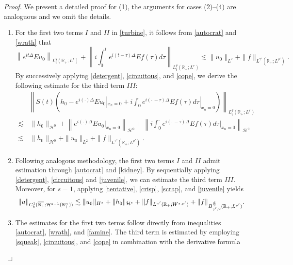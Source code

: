 \documentclass[preprint,compress,12pt]{elsarticle}
\numberwithin{equation}{section}
\begin{document}
\begin{proof}
	We present a detailed proof for (1), the arguments for cases (2)--(4) are analoguous and we omit the details.
	\begin{enumerate}[label=(\arabic*)]
		\item For the first two terms $I$ and $II$ in \eqref{turbine}, it follows from \eqref{autocrat} and \eqref{wrath} that
		\begin{equation*}
			\left\|e^{it\Delta}Eu_{0}\right\|_{L^{q}_{t}(\mathbb{R}_{+};L^{r})}+\left\|i\int_{0}^{t}e^{i(t-\tau)\Delta}Ef(\tau)d\tau\right\|_{L_{t}^{q}(\mathbb{R}_{+};L^{r})}\lesssim\|u_{0}\|_{L^{2}}+\|f\|_{L^{\gamma'}(\mathbb{R}_{+}; L^{\rho'})}.
		\end{equation*}
		By successively applying \eqref{detergent}, \eqref{circuitous}, and \eqref{cope}, we derive the following estimate for the third term $III$:
		\begin{equation*}
			\begin{aligned}
				&\left\| S(t)\left(h_{0}-e^{i(\cdot)\Delta}Eu_{0}|_{x_{n}=0}+i\int_{0}^{\cdot}e^{i(\cdot\,-\tau)\Delta}Ef(\tau)d\tau|_{x_{n}=0}\right)\right\|_{L_{t}^{q}(\mathbb{R}_{+};L^{r})}\\
				\lesssim &\, \|h_{0}\|_{\mathcal{H}^{0}}+\left\|e^{i(\cdot)\Delta}Eu_{0}|_{x_{n}=0}\right\|_{\mathcal{H}^{0}}+\left\|i\int_{0}^{\cdot}e^{i(\cdot\,-\tau)\Delta}Ef(\tau)d\tau|_{x_{n}=0}\right\|_{\mathcal{H}^{0}}\\
				\lesssim &\, \|h_{0}\|_{\mathcal{H}^{0}}+\|u_{0}\|_{L^{2}}+\|f\|_{L^{\gamma'}(\mathbb{R}_{+};L^{\rho'})}.
			\end{aligned}
		\end{equation*}
		\item Following analogous methodology, the first two terms $I$ and $II$ admit estimation through \eqref{autocrat} and \eqref{kidney}. By sequentially applying \eqref{detergent}, \eqref{circuitous} and \eqref{juvenile}, we can estimate the third term $III$. Moreover, for $s=1$, applying \eqref{tentative}, \eqref{crisp}, \eqref{scrap}, and \eqref{juvenile} yields
		\begin{equation}\label{contagious}
			\|u\|_{ C_{b}^{1}(\overline{\mathbb{R}_{+}\mkern-4mu}\,;\mathcal{H}^{s-1}(\mathbb{R}_{+}^{n}))}\lesssim\|u_{0}\|_{H^{s}}+\|h_{0}\|_{\mathcal{H}^{s}}+ \|f\|_{L^{\gamma'} (\mathbb{R}_{+};  W^{s,\rho'})}+\|f\|_{B^{\frac{s}{2}}_{\gamma',2} (\mathbb{R}_{+}; L^{\rho'})}.
		\end{equation}
		\item The estimates for the first two terms follow directly from inequalities \eqref{autocrat}, \eqref{wrath}, and \eqref{famine}. The third term is estimated by employing \eqref{squeak}, \eqref{circuitous}, and \eqref{cope} in combination with the derivative formula

\end{enumerate}
\end{proof}
\end{document}
